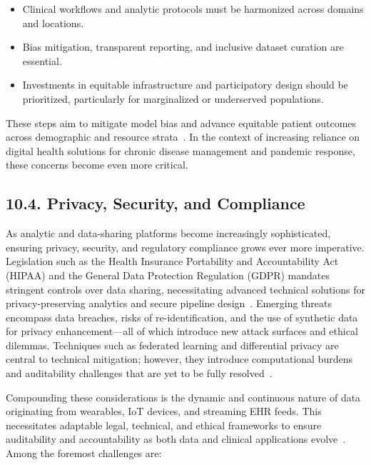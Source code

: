 \documentclass[11pt]{article}
\begin{document}
\begin{itemize}
    \item Clinical workflows and analytic protocols must be harmonized across domains and locations.
    \item Bias mitigation, transparent reporting, and inclusive dataset curation are essential.
    \item Investments in equitable infrastructure and participatory design should be prioritized, particularly for marginalized or underserved populations.
\end{itemize}

These steps aim to mitigate model bias and advance equitable patient outcomes across demographic and resource strata~\cite{ref44,ref45,ref50,ref55,ref60,ref61,ref64,ref65,ref66,ref67,ref74,ref75,ref78,ref79,ref80,ref84,ref90,ref106}. In the context of increasing reliance on digital health solutions for chronic disease management and pandemic response, these concerns become even more critical.

\subsection{10.4. Privacy, Security, and Compliance}

As analytic and data-sharing platforms become increasingly sophisticated, ensuring privacy, security, and regulatory compliance grows ever more imperative. Legislation such as the Health Insurance Portability and Accountability Act (HIPAA) and the General Data Protection Regulation (GDPR) mandates stringent controls over data sharing, necessitating advanced technical solutions for privacy-preserving analytics and secure pipeline design~\cite{ref2,ref4,ref5,ref6,ref7,ref8,ref9,ref10,ref24,ref25,ref28,ref30,ref31,ref33,ref34,ref35,ref36,ref41,ref43,ref46,ref50,ref54,ref51,ref61,ref62,ref63,ref64,ref65,ref70,ref71,ref72,ref75,ref76,ref77,ref78,ref79,ref82,ref83,ref84,ref90,ref91,ref106}. Emerging threats encompass data breaches, risks of re-identification, and the use of synthetic data for privacy enhancement—all of which introduce new attack surfaces and ethical dilemmas. Techniques such as federated learning and differential privacy are central to technical mitigation; however, they introduce computational burdens and auditability challenges that are yet to be fully resolved~\cite{ref5,ref6,ref7,ref54,ref65,ref71,ref72,ref75,ref77,ref78,ref79,ref84,ref90,ref91,ref106}.

Compounding these considerations is the dynamic and continuous nature of data originating from wearables, IoT devices, and streaming EHR feeds. This necessitates adaptable legal, technical, and ethical frameworks to ensure auditability and accountability as both data and clinical applications evolve~\cite{ref51,ref56,ref61,ref63,ref65,ref70,ref72,ref75,ref76,ref78,ref82,ref84,ref90,ref91,ref106}. Among the foremost challenges are:
\end{document}
